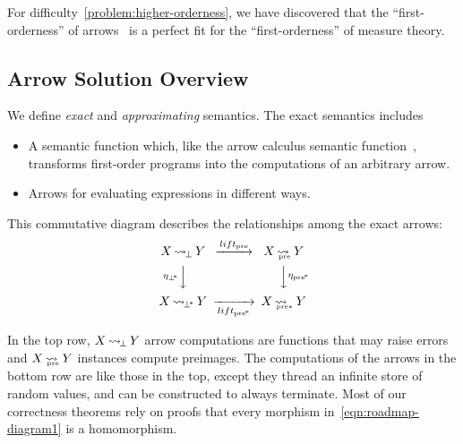 \documentclass{llncs}
\newcommand{\arrow}{\rightsquigarrow}
\newcommand{\arrowlift}{\ensuremath{lift}}
\DeclareMathOperator{\botto}{\arrow_{\mspace{-3mu}\bot}}
\newcommand{\pre}{_\mathrm{pre}}
\DeclareMathOperator{\preto}{\arrow_{\mspace{-19mu}\pre}}
\newcommand{\liftpre}{\arrowlift\pre}
\newcommand{\pbot}{{\bot^{\mspace{-4mu}*}}}
\DeclareMathOperator{\pbotto}{\arrow_{\mspace{-3mu}\pbot}}
\newcommand{\ppre}{_\mathrm{pre^{\mspace{-2mu}*}}}
\DeclareMathOperator{\ppreto}{\arrow_{\mspace{-19mu}_{\mathrm{pre*}}}}
\newcommand{\liftppre}{\arrowlift\ppre}
\begin{document}
For difficulty~\ref{problem:higher-orderness}, we have discovered that the ``first-orderness'' of arrows~\cite{cit:hughes-2000scp-arrows} is a perfect fit for the ``first-orderness'' of measure theory.


\subsection{Arrow Solution Overview}

\newcommand{\youarehere}[1]%
{%
\begin{equation}%
\begin{CD}%
X \botto Y   @>\liftpre>>   X \preto Y \\%
@V{\eta_\pbot}VV              @VV{\eta\ppre}V\\%
X \pbotto Y  @>>\liftppre>  X \ppreto Y%
\end{CD}%
\label{#1}%
\end{equation}%
}

We define \emph{exact} and \emph{approximating} semantics.
The exact semantics includes
\begin{itemize}
	\item A semantic function which, like the arrow calculus semantic function~\cite{cit:lindley-2010jfp-arrow-calculus}, transforms first-order programs into the computations of an arbitrary arrow.
	\item Arrows for evaluating expressions in different ways.
\end{itemize}
This commutative diagram describes the relationships among the exact arrows:
\youarehere{eqn:roadmap-diagram1}
In the top row, $X \botto Y$ arrow computations are functions that may raise errors and $X \preto Y$ instances compute preimages.
The computations of the arrows in the bottom row are like those in the top, except they thread an infinite store of random values, and can be constructed to always terminate.
Most of our correctness theorems rely on proofs that every morphism in~\eqref{eqn:roadmap-diagram1} is a homomorphism.
\end{document}
